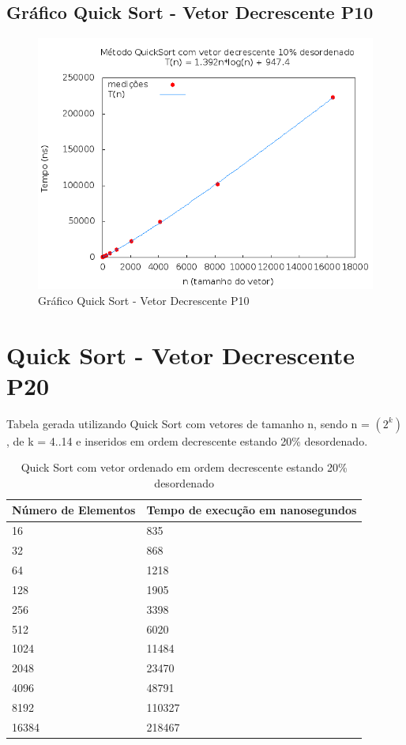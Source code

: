 \documentclass[12pt,a4paper,twoside]{report}
\begin{document}
\subsection{Gráfico Quick Sort - Vetor Decrescente P10}
\begin{figure}[H]
    \centering
    \includegraphics[width=0.7\linewidth]{graficos/QuickSort/vIntDecrescenteP10/vIntDecrescenteP10.png}
  \caption{Gráfico Quick Sort - Vetor Decrescente P10}
\end{figure}

\section{Quick Sort - Vetor Decrescente P20}
Tabela gerada utilizando Quick Sort com vetores de tamanho n, sendo n = $(2^k)$, de k = 4..14 e inseridos em ordem decrescente estando 20\% desordenado.
\begin{table}[H]
\centering
\caption{Quick Sort com vetor ordenado em ordem decrescente estando 20\% desordenado}
\label{my-label}
\begin{tabular}{|l|l|}
\hline
\multicolumn{1}{|c|}{\textbf{Número de Elementos}} & \multicolumn{1}{c|}{\textbf{Tempo de execução em nanosegundos}} \\ \hline
16 & 835 \\ \hline
32 & 868 \\ \hline
64 & 1218 \\ \hline
128 & 1905 \\ \hline
256 & 3398 \\ \hline
512 & 6020 \\ \hline
1024 & 11484 \\ \hline
2048 & 23470 \\ \hline
4096 & 48791 \\ \hline
8192 & 110327 \\ \hline
16384 & 218467 \\ \hline
\end{tabular}
\end{table}
\end{document}
